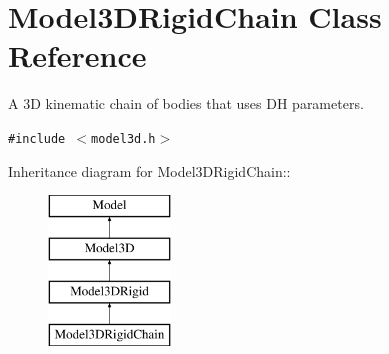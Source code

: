 \section{Model3DRigid\-Chain  Class Reference}
\label{classModel3DRigidChain}
A 3D kinematic chain of bodies that uses DH parameters. 


{\tt \#include $<$model3d.h$>$}

Inheritance diagram for Model3DRigid\-Chain::\begin{figure}[H]
\begin{center}
\leavevmode
\includegraphics[height=4cm]{classModel3DRigidChain}
\end{center}
\end{figure}
